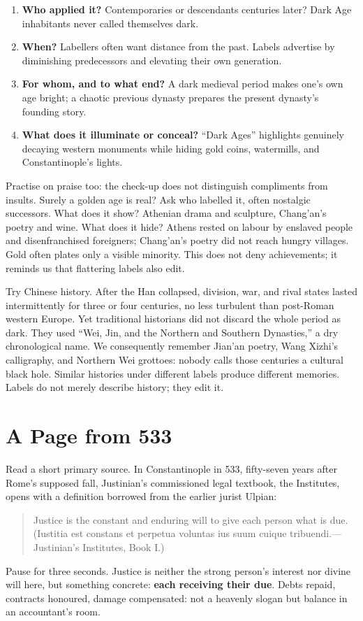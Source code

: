 \begin{enumerate}
\item \textbf{Who applied it?} Contemporaries or descendants centuries later? Dark Age inhabitants never called themselves dark.
\item \textbf{When?} Labellers often want distance from the past. Labels advertise by diminishing predecessors and elevating their own generation.
\item \textbf{For whom, and to what end?} A dark medieval period makes one's own age bright; a chaotic previous dynasty prepares the present dynasty's founding story.
\item \textbf{What does it illuminate or conceal?} ``Dark Ages'' highlights genuinely decaying western monuments while hiding gold coins, watermills, and Constantinople's lights.
\end{enumerate}
Practise on praise too: the check-up does not distinguish compliments from insults. Surely a golden age is real? Ask who labelled it, often nostalgic successors. What does it show? Athenian drama and sculpture, Chang'an's poetry and wine. What does it hide? Athens rested on labour by enslaved people and disenfranchised foreigners; Chang'an's poetry did not reach hungry villages. Gold often plates only a visible minority. This does not deny achievements; it reminds us that flattering labels also edit.

Try Chinese history. After the Han collapsed, division, war, and rival states lasted intermittently for three or four centuries, no less turbulent than post-Roman western Europe. Yet traditional historians did not discard the whole period as dark. They used ``Wei, Jin, and the Northern and Southern Dynasties,'' a dry chronological name. We consequently remember Jian'an poetry, Wang Xizhi's calligraphy, and Northern Wei grottoes: nobody calls those centuries a cultural black hole. Similar histories under different labels produce different memories. Labels do not merely describe history; they edit it.

\section{A Page from 533}
Read a short primary source. In Constantinople in 533, fifty-seven years after Rome's supposed fall, Justinian's commissioned legal textbook, the Institutes, opens with a definition borrowed from the earlier jurist Ulpian:

\begin{quote}
Justice is the constant and enduring will to give each person what is due. (Iustitia est constans et perpetua voluntas ius suum cuique tribuendi.---Justinian's Institutes, Book I.)
\end{quote}
Pause for three seconds. Justice is neither the strong person's interest nor divine will here, but something concrete: \textbf{each receiving their due}. Debts repaid, contracts honoured, damage compensated: not a heavenly slogan but balance in an accountant's room.

